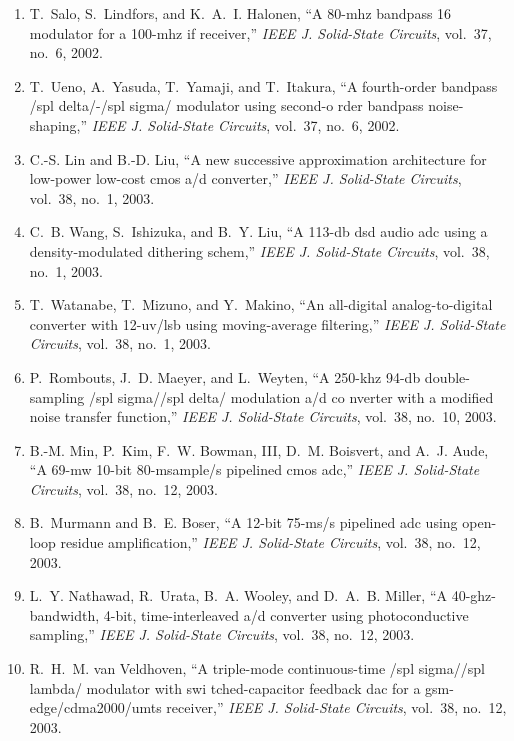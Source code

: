 \begin{enumerate}
\item
T.~Salo, S.~Lindfors, and K.~A.~I. Halonen, ``A 80-mhz bandpass 16 modulator
  for a 100-mhz if receiver,'' \emph{{IEEE} J. Solid-State Circuits}, vol.~37,
  no.~6, 2002.

\item
T.~Ueno, A.~Yasuda, T.~Yamaji, and T.~Itakura, ``A fourth-order bandpass /spl
  delta/-/spl sigma/ modulator using second-o rder bandpass noise-shaping,''
  \emph{{IEEE} J. Solid-State Circuits}, vol.~37, no.~6, 2002.

\item
C.-S. Lin and B.-D. Liu, ``A new successive approximation architecture for
  low-power low-cost cmos a/d converter,'' \emph{{IEEE} J. Solid-State
  Circuits}, vol.~38, no.~1, 2003.

\item
C.~B. Wang, S.~Ishizuka, and B.~Y. Liu, ``A 113-db dsd audio adc using a
  density-modulated dithering schem,'' \emph{{IEEE} J. Solid-State Circuits},
  vol.~38, no.~1, 2003.

\item
T.~Watanabe, T.~Mizuno, and Y.~Makino, ``An all-digital analog-to-digital
  converter with 12-uv/lsb using moving-average filtering,'' \emph{{IEEE} J.
  Solid-State Circuits}, vol.~38, no.~1, 2003.

\item
P.~Rombouts, J.~D. Maeyer, and L.~Weyten, ``A 250-khz 94-db double-sampling
  /spl sigma//spl delta/ modulation a/d co nverter with a modified noise
  transfer function,'' \emph{{IEEE} J. Solid-State Circuits}, vol.~38, no.~10,
  2003.

\item
B.-M. Min, P.~Kim, F.~W. Bowman, III, D.~M. Boisvert, and A.~J. Aude, ``A 69-mw
  10-bit 80-msample/s pipelined cmos adc,'' \emph{{IEEE} J. Solid-State
  Circuits}, vol.~38, no.~12, 2003.

\item
B.~Murmann and B.~E. Boser, ``A 12-bit 75-ms/s pipelined adc using open-loop
  residue amplification,'' \emph{{IEEE} J. Solid-State Circuits}, vol.~38,
  no.~12, 2003.

\item
L.~Y. Nathawad, R.~Urata, B.~A. Wooley, and D.~A.~B. Miller, ``A
  40-ghz-bandwidth, 4-bit, time-interleaved a/d converter using photoconductive
  sampling,'' \emph{{IEEE} J. Solid-State Circuits}, vol.~38, no.~12, 2003.

\item
R.~H.~M. van Veldhoven, ``A triple-mode continuous-time /spl sigma//spl lambda/
  modulator with swi tched-capacitor feedback dac for a gsm-edge/cdma2000/umts
  receiver,'' \emph{{IEEE} J. Solid-State Circuits}, vol.~38, no.~12, 2003.


\end{enumerate}
